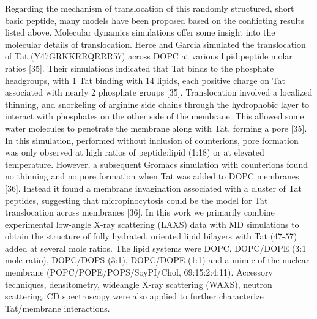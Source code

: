 Regarding the mechanism of translocation of this randomly structured, short 
basic
peptide, many models have been proposed based on the conflicting results listed 
above.
Molecular dynamics simulations offer some insight into the molecular details of 
translocation.
Herce and Garcia simulated the translocation of Tat (Y47GRKKRRQRRR57) across 
DOPC at
various lipid:peptide molar ratios [35]. Their simulations indicated that Tat 
binds to the
phosphate headgroups, with 1 Tat binding with 14 lipids, each positive charge 
on Tat associated
with nearly 2 phosphate groups [35]. Translocation involved a localized 
thinning, and
snorkeling of arginine side chains through the hydrophobic layer to interact 
with phosphates on
the other side of the membrane. This allowed some water molecules to penetrate 
the membrane
along with Tat, forming a pore [35]. In this simulation, performed without 
inclusion of
counterions, pore formation was only observed at high ratios of peptide:lipid (1:18) 
or at
elevated temperature. However, a subsequent Gromacs simulation with counterions 
found no
thinning and no pore formation when Tat was added to DOPC membranes [36]. 
Instead it found
a membrane invagination associated with a cluster of Tat peptides, suggesting 
that
micropinocytosis could be the model for Tat translocation across membranes [36].
In this work we primarily combine experimental low-angle X-ray scattering (LAXS) 
data
with MD simulations to obtain the structure of fully hydrated, oriented lipid 
bilayers with Tat
(47-57) added at several mole ratios. The lipid systems were DOPC, DOPC/DOPE 
(3:1 mole
ratio), DOPC/DOPS (3:1), DOPC/DOPE (1:1) and a mimic of the nuclear membrane
(POPC/POPE/POPS/SoyPI/Chol, 69:15:2:4:11). Accessory techniques, densitometry, 
wideangle
X-ray scattering (WAXS), neutron scattering, CD spectroscopy were also applied 
to
further characterize Tat/membrane interactions.
